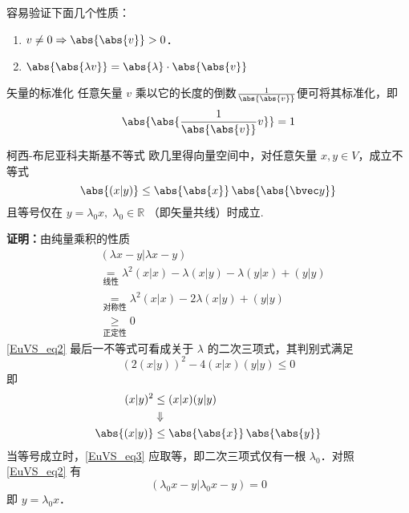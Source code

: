 容易验证下面几个性质：
\begin{enumerate}
\item $v\neq0\Rightarrow \abs{\abs{v}}>0$．
\item $\abs{\abs{\lambda v}}=\abs{\lambda}\cdot\abs{\abs{ v}}$
\end{enumerate}


\begin{example}{矢量的标准化}\label{EuVS_ex2}
任意矢量 $v$ 乘以它的长度的倒数$\frac{1}{\abs{\abs{ v}}}$便可将其标准化，即
\begin{equation}
\abs{\abs{\frac{1}{\abs{\abs{v}}}v}}=1
\end{equation}
\end{example}
\begin{theorem}{柯西-布尼亚科夫斯基不等式}\label{EuVS_the1}
欧几里得向量空间中，对任意矢量 $x,y\in V$，成立不等式
\begin{equation}\label{EuVS_eq4}
\abs{(x|y)}\leq\abs{\abs{x}}\,\abs{\abs{\bvec y}}
\end{equation}
且等号仅在 $y=\lambda_0 x,\;\lambda_0\in\mathbb R$ （即矢量共线）时成立.
\end{theorem}
\textbf{证明：}由纯量乘积的性质
\begin{equation}\label{EuVS_eq2}
\begin{aligned}
&(\lambda x-y|\lambda x- y)\\
&\underset{\text{线性}}{=}\lambda^2( x|x)-\lambda (x|y)-\lambda (y|x)+(y|y)\\
&\underset{\text{对称性}}{=}\lambda^2(x|x)-2\lambda (x|y)+(y|y)\\
&\underset{\text{正定性}}{\geq}0
\end{aligned}
\end{equation}
\autoref{EuVS_eq2} 最后一不等式可看成关于 $\lambda$ 的二次三项式，其判别式满足
\begin{equation}\label{EuVS_eq3}
(2(x|y))^2-4(x| x)(y|y)\leq0
\end{equation}
即
\begin{equation}
\begin{aligned}
(x|y)^2&\leq(x|x)(y|y)\\
&\Downarrow\\
\abs{(x| y)}&\leq\abs{\abs{x}}\,\abs{\abs{y}}
\end{aligned}
\end{equation}
当等号成立时，\autoref{EuVS_eq3} 应取等，即二次三项式仅有一根 $\lambda_0$．对照\autoref{EuVS_eq2} 有
\begin{equation}
(\lambda_0 x- y|\lambda_0 x-y)=0
\end{equation}
即 $ y=\lambda_0 x$．

